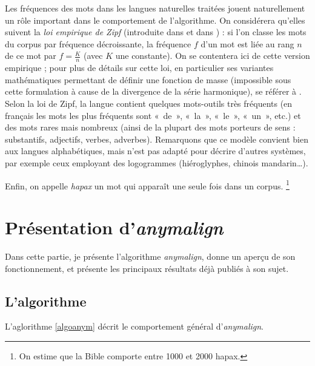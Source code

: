 \documentclass[a4paper,10pt]{article}
\newcommand{\anym}{\emph{anymalign}}
\newcommand{\guill}[1]{«~#1~»}
\begin{document}
Les fréquences des mots dans les langues naturelles traitées jouent naturellement un rôle important dans le comportement de l'algorithme. On considérera qu'elles suivent la \emph{loi empirique de Zipf} (introduite dans \cite{zipf1935psycho} et dans \cite{zipf1949human})
: si l'on classe les mots du corpus par fréquence décroissante, la fréquence $f$ d'un mot est liée au rang $n$ de ce mot par $f = \frac{K}{n}$ (avec $K$ une constante). On se contentera ici de cette version empirique ; pour plus de détails sur cette loi, en particulier ses variantes mathématiques permettant de définir une fonction de masse (impossible sous cette formulation à cause de la divergence de la série harmonique), se référer à \cite{baayen2001word}. Selon la loi de Zipf, la langue contient quelques mots-outils très fréquents (en français les mots les plus fréquents sont \guill{de}, \guill{la}, \guill{le}, \guill{un}, etc.) et des mots rares mais nombreux (ainsi de la plupart des mots porteurs de sens : substantifs, adjectifs, verbes, adverbes). Remarquons que ce modèle convient bien aux langues alphabétiques, mais n'est pas adapté pour décrire d'autres systèmes, par exemple ceux employant des logogrammes (hiéroglyphes, chinois mandarin\dots).

Enfin, on appelle \emph{hapax} un mot qui apparaît une seule fois dans un corpus. \footnote{On estime que la Bible comporte entre 1000 et 2000 hapax.}



\section{Présentation d'\emph{anymalign}}

Dans cette partie, je présente l'algorithme \anym, donne un aperçu de son fonctionnement, et présente les principaux résultats déjà publiés à son sujet.

\subsection{L'algorithme}

L'aglorithme \ref{algoanym} décrit le comportement général d'\anym.
\end{document}
